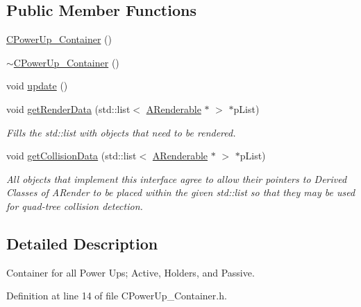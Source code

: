 \subsection*{Public Member Functions}
\begin{DoxyCompactItemize}
\item 
\hyperlink{classCPowerUp__Container_a8c128b6f1bccfd1e6f7eb028fe712d08}{C\-Power\-Up\-\_\-\-Container} ()
\item 
\hyperlink{classCPowerUp__Container_ab3589001ff7896264e9d346a9f2eec04}{$\sim$\-C\-Power\-Up\-\_\-\-Container} ()
\item 
void \hyperlink{classCPowerUp__Container_a88ec74dab0f7d8721ad7a0be644a5db7}{update} ()
\item 
void \hyperlink{classCPowerUp__Container_a5e224fbb40c3d6dbea785b47f00ae91e}{get\-Render\-Data} (std\-::list$<$ \hyperlink{classARenderable}{A\-Renderable} $\ast$ $>$ $\ast$p\-List)
\begin{DoxyCompactList}\small\item\em Fills the std\-::list with objects that need to be rendered. \end{DoxyCompactList}\item 
void \hyperlink{classCPowerUp__Container_a421cefb37e5913348f8bce1fbbef2126}{get\-Collision\-Data} (std\-::list$<$ \hyperlink{classARenderable}{A\-Renderable} $\ast$ $>$ $\ast$p\-List)
\begin{DoxyCompactList}\small\item\em All objects that implement this interface agree to allow their pointers to Derived Classes of A\-Render to be placed within the given std\-::list so that they may be used for quad-\/tree collision detection. \end{DoxyCompactList}\end{DoxyCompactItemize}


\subsection{Detailed Description}
Container for all Power Ups; Active, Holders, and Passive. 

Definition at line 14 of file C\-Power\-Up\-\_\-\-Container.\-h.




